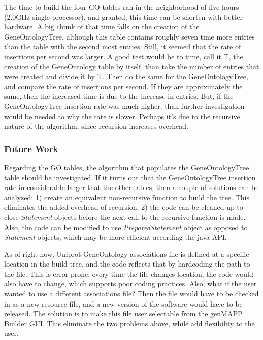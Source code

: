 The time to build the four GO tables ran in the neighborhood of five hours (2.0GHz single processor), and
granted, this time can be shorten with better hardware. A big chunk of that time falls on the creation of the
GeneOntologyTree, although this table contains roughly seven time more entries than the table with the second
most entries. Still, it seemed that the rate of insertions per second was larger.
A good test would be to time, call it T, the creation of the
GeneOntology table by itself, than take the number of entries that were created and divide it by T. Then do the same for the
GeneOntologyTree, and compare the rate of insertions per second. If they are approximately the same, then the increased time
is due to the increase in entries. But, if the GeneOntologyTree insertion rate was much higher, than further investigation would be
needed to why the rate is slower. Perhaps it's due to the recursive nature of the algorithm, since recursion increases overhead.


\subsubsection{Future Work}
Regarding the GO tables, the algorithm that populates the GeneOntologyTree table should be investigated.
If it turns out that the GeneOntologyTree insertion rate in considerable larger that the other tables, then
a couple of solutions can be analyzed: 1) create an equivalent non-recursive function to build the tree. This
eliminates the added overhead of recursion; 2) the code can be cleaned up to
close \emph{Statement} objects before the next call to the recursive function is made. Also, the code can
be modified to use \emph{PreparedStatement} object as opposed to \emph{Statement} objects, which may be more
efficient according the java API.


As of right now, Uniprot-GeneOntology associations file is defined at a specific location in the build tree,
and the code reflects that by hardcoding the path to the file. This is error prone: every time the file changes location,
the code would also have to change, which supports poor coding practices. Also, what if the user wanted to use a different
associations file? Then the file would have to be checked in as a new resource file, and a new version of the software would have
to be released. The solution is to make this file user selectable from the genMAPP Builder GUI. This eliminate the two problems
above, while add flexibility to the user.
